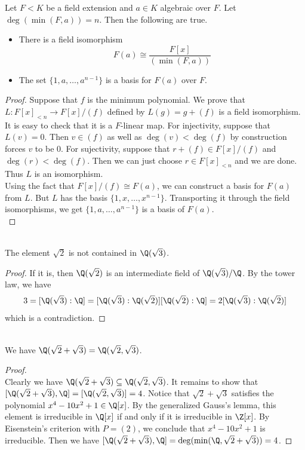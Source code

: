 \documentclass[a4paper]{article}
\begin{document}
\begin{prp}{}{} Let $F<K$ be a field extension and $a\in K$ algebraic over $F$. Let $\deg(\min(F,a))=n$. Then the following are true. 
\begin{itemize}
\item There is a field isomorphism $$F(a)\cong\frac{F[x]}{(\min(F,a))}$$
\item The set $\{1,a,\dots,a^{n-1}\}$ is a basis for $F(a)$ over $F$. 
\end{itemize}
\begin{proof}
Suppose that $f$ is the minimum polynomial. We prove that $L:F[x]_{<n}\to F[x]/(f)$ defined by $L(g)=g+(f)$ is a field isomorphism. It is easy to check that it is a $F$-linear map. For injectivity, suppose that $L(v)=0$. Then $v\in(f)$ as well as $\deg(v)<\deg(f)$ by construction forces $v$ to be $0$. For sujectivity, suppose that $r+(f)\in F[x]/(f)$ and $\deg(r)<\deg(f)$. Then we can just choose $r\in F[x]_{<n}$ and we are done. Thus $L$ is an isomorphism. \\
Using the fact that $F[x]/(f)\cong F(a)$, we can construct a basis for $F(a)$ from $L$. But $L$ has the basis $\{1,x,\dots,x^{n-1}\}$. Transporting it through the field isomorphisms, we get $\{1,a,\dots,a^{n-1}\}$ is a basis of $F(a)$. \\
\end{proof}
\end{prp}

\begin{eg}{}{}\\
The element $\sqrt{2}$ is not contained in $\Q(\sqrt{3})$. 
\begin{proof}
If it is, then $\Q(\sqrt{2})$ is an intermediate field of $\Q(\sqrt{3})/\Q$. By the tower law, we have $$3=[\Q(\sqrt{3}):\Q]=[\Q(\sqrt{3}):\Q(\sqrt{2})][\Q(\sqrt{2}):\Q]=2[\Q(\sqrt{3}):\Q(\sqrt{2})]$$ which is a contradiction. 
\end{proof}
\end{eg}

\begin{eg}{}{}\\
We have $\Q(\sqrt{2}+\sqrt{3})=\Q(\sqrt{2},\sqrt{3})$. 
\begin{proof}\\
Clearly we have $\Q(\sqrt{2}+\sqrt{3})\subseteq\Q(\sqrt{2},\sqrt{3})$. It remains to show that $[\Q(\sqrt{2}+\sqrt{3}),\Q]=[\Q(\sqrt{2},\sqrt{3})]=4$. Notice that $\sqrt{2}+\sqrt{3}$ satisfies the polynomial $x^4-10x^2+1\in\Q[x]$. By the generalized Gauss's lemma, this element is irreducible in $\Q[x]$ if and only if it is irreducible in $\Z[x]$. By Eisenstein's criterion with $P=(2)$, we conclude that $x^4-10x^2+1$ is irreducible. Then we have $[\Q(\sqrt{2}+\sqrt{3}),\Q]=\deg(\min(\Q,\sqrt{2}+\sqrt{3}))=4$. 
\end{proof}
\end{eg}
\end{document}
